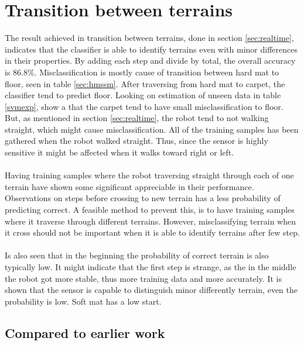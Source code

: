 \documentclass[USenglish]{ifimaster}  %
\begin{document}
\section{Transition between terrains}
The result achieved in transition between terrains, done in section \ref{sec:realtime}, indicates that the classifier is able to identify terrains even with minor differences in their properties. By adding each step and divide by total, the overall accuracy is  86.8\%. Misclassification is mostly cause of transition between hard mat to floor, seen in table \ref{sec:hmssm}. After traversing from hard mat to carpet, the classifier tend to predict floor. Looking on estimation of unseen data in table \ref{svmexp}, show a that the carpet tend to have small misclassification to floor. But, as mentioned in section \ref{sec:realtime}, the robot tend to not walking straight, which might cause misclassification. All of the training samples has been gathered when the robot walked straight. Thus, since the sensor is highly sensitive it might be affected when it walks toward right or left.
\\
\\
Having training samples where the robot traversing straight through each of one terrain have shown some significant appreciable in their performance. Observations on steps before crossing to new terrain has a less probability of predicting correct. A feasible method to prevent this, is to have training samples where it traverse through different terrains. However, misclassifying terrain when it cross should not be important when it is able to identify terrains after few step.    
\\
\\
Is also seen that in the beginning the probability of correct terrain is also typically low. It might indicate that the first step is strange, as the in the middle the robot got more stable, thus more training data and more accurately. It is shown that the sensor is capable to distinguish minor differently terrain, even the probability is low. Soft mat has a low start.

\subsection{Compared to earlier work}
\end{document}
